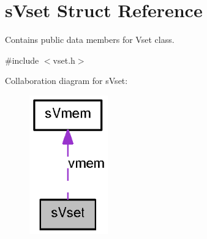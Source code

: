\section{sVset Struct Reference}
\label{a00006}


Contains public data members for Vset class.  




{\ttfamily \#include $<$vset.h$>$}



Collaboration diagram for sVset:
\nopagebreak
\begin{figure}[H]
\begin{center}
\leavevmode
\includegraphics[width=96pt]{a00062}
\end{center}
\end{figure}
